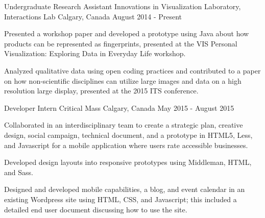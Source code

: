 \begin{cventries}
  \cventry
    {Undergraduate Research Assistant}
    {Innovations in Visualization Laboratory, Interactions Lab}
    {Calgary, Canada}
    {August 2014 - Present}
    {
      \begin{cvitems}
       \item {Presented a workshop paper and developed a prototype using Java about how products can be represented as fingerprints, presented at the VIS Personal Visualization: Exploring Data in Everyday Life workshop.}
        \item {Analyzed qualitative data using open coding practices and contributed to a paper on how non-scientific disciplines can utilize large images and data on a high resolution large display, presented at the 2015 ITS conference.}
      \end{cvitems}
    }
  \cventry
    {Developer Intern}
    {Critical Mass}
    {Calgary, Canada}
    {May 2015 - August 2015}
    {
      \begin{cvitems}
        \item {Collaborated in an interdisciplinary team to create a strategic plan, creative design, social campaign, technical document, and a prototype in HTML5, Less, and Javascript for a mobile application where users rate accessible businesses.}
        \item {Developed design layouts into responsive prototypes using Middleman, HTML, and Sass.}
        \item {Designed and developed mobile capabilities, a blog, and event calendar in an existing Wordpress site using HTML, CSS, and Javascript; this included a detailed end user document discussing how to use the site.}
      \end{cvitems}
    }
 \end{cventries}
